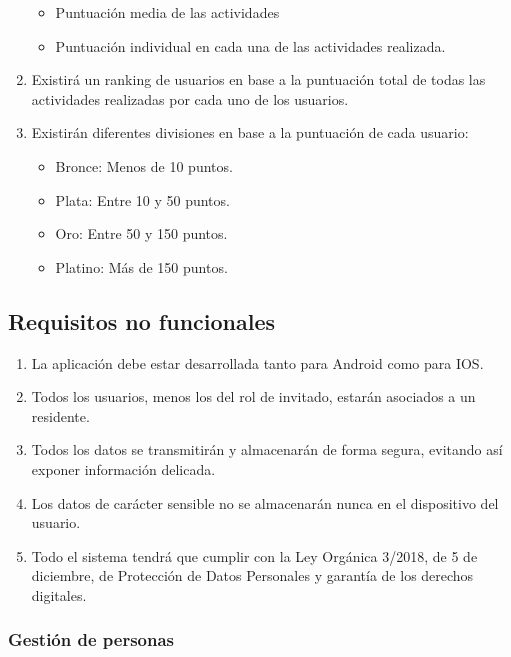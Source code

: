 \begin{enumerate}[start=37,label={RF-\arabic*.}]
\begin{itemize}
            \item Puntuación media de las actividades
            \item Puntuación individual en cada una de las actividades realizada.
        \end{itemize}
    \item Existirá un ranking de usuarios en base a la puntuación total de todas las actividades realizadas por cada uno de los usuarios.
    \item Existirán diferentes divisiones en base a la puntuación de cada usuario:
        \begin{itemize}
            \item Bronce: Menos de 10 puntos.
            \item Plata: Entre 10 y 50 puntos.
            \item Oro: Entre 50 y 150 puntos.
            \item Platino: Más de 150 puntos.
        \end{itemize}

\end{enumerate}

\subsection{Requisitos no funcionales}

\begin{enumerate}[start=1,label={RNF-\arabic*.}]
    \item \label{rnf-plataformas}La aplicación debe estar desarrollada tanto para Android como para IOS.
    \item Todos los usuarios, menos los del rol de invitado, estarán asociados a un residente.
    \item Todos los datos se transmitirán y almacenarán de forma segura, evitando así exponer información delicada.
    \item Los datos de carácter sensible no se almacenarán nunca en el dispositivo del usuario.
    \item Todo el sistema tendrá que cumplir con la Ley Orgánica 3/2018, de 5 de diciembre, de Protección de Datos Personales y garantía de los derechos digitales.
\end{enumerate}

\subsubsection{Gestión de personas}

